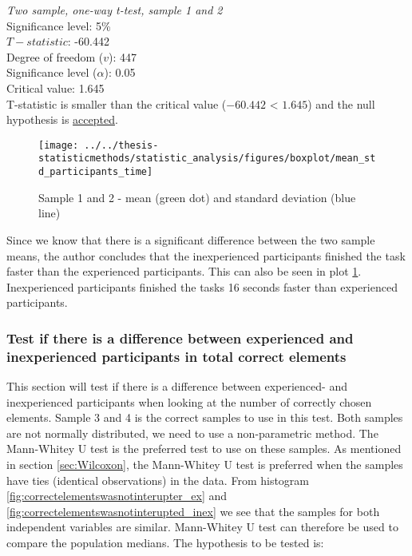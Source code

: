 \begin{center}
	\begin{tcolorbox}[width=0.8\textwidth]
		\centering
		\textit{Two sample, one-way t-test, sample 1 and 2}\\
		Significance level: 5\%  \\[0.5cm]
		
		$T-statistic$: -60.442 \\
		Degree of freedom ($v$): 447 \\ %
		Significance level ($\alpha$): 0.05 \\
		Critical value: 1.645\\[0.2cm]
		
		T-statistic is smaller than the critical value ($-60.442$ < $1.645$) and the null hypothesis is \underline{accepted}.\\[0.5cm]
	\end{tcolorbox} 
\end{center}

\begin{figure}[H]
	\centering
	\texttt{[image: ../../thesis-statisticmethods/statistic\_analysis/figures/boxplot/mean\_std\_participants\_time]}
	\caption{Sample 1 and 2 - mean (green dot) and standard deviation (blue line)}
	\label{fig:meanstdparticipantstime}
\end{figure}

Since we know that there is a significant difference between the two sample means, the author concludes that the inexperienced participants finished the task faster than the experienced participants. This can also be seen in plot \ref{fig:meanstdparticipantstime}. Inexperienced participants finished the tasks 16 seconds faster than experienced participants. \newline

\subsubsection[Sample 3, 4]{Test if there is a difference between experienced and inexperienced participants in total correct elements} %

This section will test if there is a difference between experienced- and inexperienced participants when looking at the number of correctly chosen elements. Sample 3 and 4 is the correct samples to use in this test. Both samples are not normally distributed, we need to use a non-parametric method. The Mann-Whitey U test is the preferred test to use on these samples. As mentioned in section \ref{sec:Wilcoxon}, the Mann-Whitey U test is preferred when the samples have ties (identical observations) in the data. From histogram \ref{fig:correctelementswasnotinterupter_ex} and \ref{fig:correctelementswasnotinterupted_inex} we see that the samples for both independent variables are similar. Mann-Whitey U test can therefore be used to compare the population medians. The hypothesis to be tested is:\\[0.3cm]

